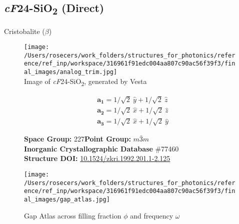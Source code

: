 \subsection{\large{\textit{cF}24-SiO\textsubscript{2} (Direct)}}\vspace{-0.1in}
Cristobalite ($\beta$)


\begin{figure}[H]
\begin{minipage}{0.34\textwidth}\centering
\texttt{[image: /Users/rosecers/work\_folders/structures\_for\_photonics/reference/ref\_inp/workspace/316961f91edc004aa807c90ac56f39f3/final\_images/analog\_trim.jpg]}\\
\small{Image of \textit{cF}24-SiO\textsubscript{2}, generated by Vesta}
\end{minipage}\hfill
\begin{minipage}{0.65\textwidth}\raggedright
{\setlength{\mathindent}{0cm}
\begin{equation*}
\begin{split}&\boldsymbol{a_1} = 1/\sqrt{2}\ \hat{y} + 1/\sqrt{2}\ \hat{z}\\[-8pt]
&\boldsymbol{a_2} = 1/\sqrt{2}\ \hat{x} + 1/\sqrt{2}\ \hat{z}\\[-8pt]
&\boldsymbol{a_3} = 1/\sqrt{2}\ \hat{x} + 1/\sqrt{2}\ \hat{y}
\end{split}
\end{equation*}}

\textbf{Space Group:}	227\hspace{0.5in}\textbf{Point Group:}	$m\bar{3}m$\\
\textbf{Inorganic Crystallographic Database} \#77460\\
\textbf{Structure DOI: }\url{10.1524/zkri.1992.201.1-2.125}

\end{minipage}\hfill
\end{figure}
\vspace{-0.25in}


\begin{figure}[H]
\begin{minipage}{0.9\textwidth}\centering
\texttt{[image: /Users/rosecers/work\_folders/structures\_for\_photonics/reference/ref\_inp/workspace/316961f91edc004aa807c90ac56f39f3/final\_images/gap\_atlas.jpg]}
\\
\end{minipage}\hfill\caption{Gap Atlas across filling fraction $\phi$ and frequency $\omega$}
\end{figure}


